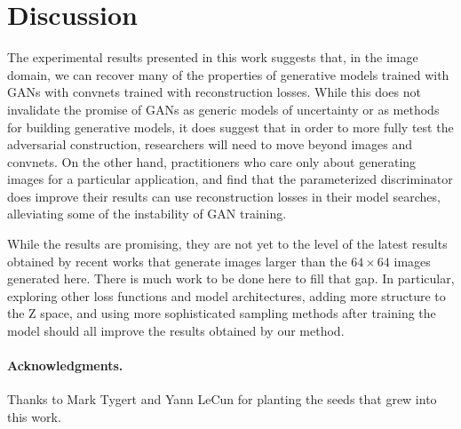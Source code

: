 \documentclass{article}
\begin{document}
\section{Discussion}\label{sec:discussion}

The experimental results presented in this work suggests that, in the image
domain, we can recover many of the properties of generative models trained with
GANs with convnets trained with reconstruction losses. While this does not invalidate the promise
of GANs as generic models of uncertainty or as methods for building generative
models, it does suggest that in order to more fully test the adversarial
construction, researchers will need to move beyond images and convnets.  On the
other hand, practitioners who care only about generating images for a
particular application, and find that the parameterized discriminator does
improve their results can use reconstruction losses in their model searches,
alleviating some of the instability of GAN training.

While the results are promising, they are not yet to the level of the latest results obtained
by recent works that generate images larger than the $64\times 64$ images generated here. There is much work to be done here to fill that gap. In particular, exploring other
loss functions and model architectures, adding more structure to the Z space, and using more sophisticated
sampling methods after training the model should all improve the results obtained by our method.

\paragraph{Acknowledgments.} Thanks to Mark Tygert and Yann LeCun for planting the seeds that grew into this work.



\end{document}
